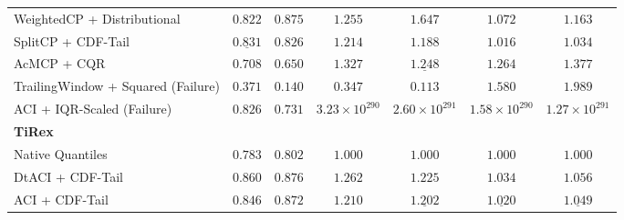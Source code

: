 \documentclass[12pt, a4paper]{article}
\begin{document}
\begin{table}[ht]
{\begin{tabular}{lcccccc}
			WeightedCP + Distributional        & \(\mathbf{0.822}\)                        & \(0.875\)                                       & \(1.255\)                                         & \(1.647\)                & \(1.072\)                & \(1.163\)                \\
			SplitCP + CDF-Tail                 & \(\underline{0.831}\)                     & \(\mathbf{0.826}\)                              & \(\mathbf{1.214}\)                                & \(\mathbf{1.188}\)       & \(\mathbf{1.016}\)       & \(\mathbf{1.034}\)       \\
			AcMCP + CQR                        & \(0.708\)                                 & \(0.650\)                                       & \(1.327\)                                         & \(\underline{1.248}\)    & \(1.264\)                & \(1.377\)                \\
			TrailingWindow + Squared (Failure) & \(0.371\)                                 & \(0.140\)                                       & \(0.347\)                                         & \(0.113\)                & \(1.580\)                & \(1.989\)                \\
			ACI + IQR-Scaled (Failure)         & \(0.826\)                                 & \(0.731\)                                       & \(3.23 \times 10^{290}\)                          & \(2.60 \times 10^{291}\) & \(1.58 \times 10^{290}\) & \(1.27 \times 10^{291}\) \\
			\hline
			\multicolumn{7}{l}{\textbf{TiRex}}                                                                                                                                                                                                                                    \\
			Native Quantiles                   & \(0.783\)                                 & \(0.802\)                                       & \(1.000\)                                         & \(1.000\)                & \(1.000\)                & \(1.000\)                \\
			\hline
			DtACI + CDF-Tail                   & \(0.860\)                                 & \(0.876\)                                       & \(1.262\)                                         & \(1.225\)                & \(1.034\)                & \(1.056\)                \\
			ACI + CDF-Tail                     & \(0.846\)                                 & \(0.872\)                                       & \(1.210\)                                         & \(\underline{1.202}\)    & \(\underline{1.020}\)    & \(\underline{1.049}\)    \\

\end{tabular}}
\end{table}
\end{document}
